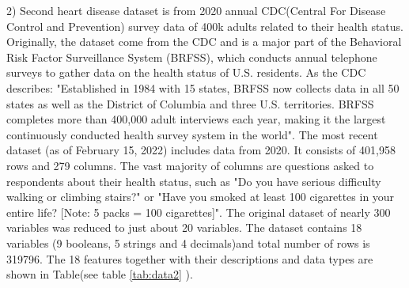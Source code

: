 \documentclass[11pt]{article}
\begin{document}
2) Second heart disease dataset is from 2020 annual CDC(Central For Disease Control and Prevention) survey data of 400k adults related to their health status. Originally, the dataset come from the CDC and is a major part of the Behavioral Risk Factor Surveillance System (BRFSS), which conducts annual telephone surveys to gather data on the health status of U.S. residents. As the CDC describes: "Established in 1984 with 15 states, BRFSS now collects data in all 50 states as well as the District of Columbia and three U.S. territories. BRFSS completes more than 400,000 adult interviews each year, making it the largest continuously conducted health survey system in the world". The most recent dataset (as of February 15, 2022) includes data from 2020. It consists of 401,958 rows and 279 columns. The vast majority of columns are questions asked to respondents about their health status, such as "Do you have serious difficulty walking or climbing stairs?" or "Have you smoked at least 100 cigarettes in your entire life? [Note: 5 packs = 100 cigarettes]". The original dataset of nearly 300 variables was reduced to just about 20 variables. The dataset contains 18 variables (9 booleans, 5 strings and 4 decimals)and total number of rows is 319796. The 18 features together with their descriptions and data types are shown in Table(see table \ref{tab:data2} ).\\
\end{document}
